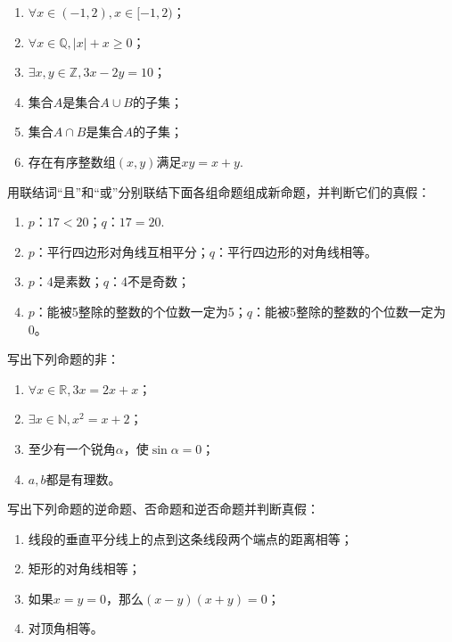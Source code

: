 \documentclass[lang=cn,math=cm,chinesefont=nofont,11pt,scheme=chinese,onecol]{elegantbook}
\begin{document}
\begin{enumerate}
  \item $\forall x\in(-1, 2), x\in[-1, 2)$；
  \item $\forall x\in\mathbb{Q}, |x|+x\geqslant0$；
  \item $\exists x,y\in\mathbb{Z},3x-2y=10$；
  \item 集合$A$是集合$A\cup B$的子集；
  \item 集合$A\cap B$是集合$A$的子集；
  \item 存在有序整数组$(x,y)$满足$xy=x+y$.
\end{enumerate}

\begin{exercise}
  用联结词“且”和“或”分别联结下面各组命题组成新命题，并判断它们的真假：
\end{exercise}

\begin{enumerate}
  \item $p$：$17<20$；$q$：$17=20$.
  \item $p$：平行四边形对角线互相平分；$q$：平行四边形的对角线相等。
  \item $p$：4是素数；$q$：4不是奇数；
  \item $p$：能被5整除的整数的个位数一定为5；$q$：能被5整除的整数的个位数一定为0。
\end{enumerate}

\begin{exercise}
  写出下列命题的非：
\end{exercise}

\begin{enumerate}
  \item $\forall x\in\mathbb{R},3x=2x+x$；
  \item $\exists x\in\mathbb{N},x^2=x+2$；
  \item 至少有一个锐角$\alpha$，使$\sin\alpha=0$；
  \item $a,b$都是有理数。
\end{enumerate}

\begin{exercise}
  写出下列命题的逆命题、否命题和逆否命题并判断真假：
\end{exercise}

\begin{enumerate}
  \item 线段的垂直平分线上的点到这条线段两个端点的距离相等；
  \item 矩形的对角线相等；
  \item 如果$x=y=0$，那么$(x-y)(x+y)=0$；
  \item 对顶角相等。
\end{enumerate}
\end{document}
